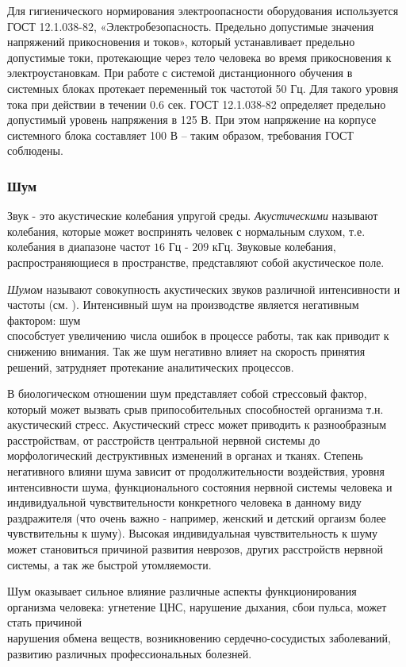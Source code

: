 Для гигиенического нормирования электроопасности оборудования используется ГОСТ 12.1.038-82, «Электробезопасность. Предельно допустимые значения напряжений  прикос\-новения и токов», который устанавливает предельно допустимые токи, протекающие через тело человека во время прикосновения к электроустановкам.
При работе с системой дистан\-ционного обучения в системных блоках протекает переменный ток частотой 50 Гц. Для такого уровня тока при действии в течении 0.6 сек. ГОСТ 12.1.038-82 определяет предельно допустимый уровень напряжения в 125 В. При этом напряжение на корпусе системного блока составляет 100 В – таким образом, требования ГОСТ соблюдены.

\subsubsection{Шум}

Звук - это акустические колебания упругой среды. {\itshape Акустическими} называют колебания, которые может воспринять человек с нормальным слухом, т.е. колебания в диапазоне частот $16$ Гц - $209$ кГц. Звуковые колебания, распространяющиеся в пространстве, предста\-вляют собой акустическое поле.

{\itshape Шумом} называют совокупность акустических звуков различной интенсивности и часто\-ты (см. \cite{10.}). Интенсивный шум на производстве является негативным фактором: шум\\ способстует увеличению числа ошибок в процессе работы, так как приводит к снижению внимания. Так же шум негативно влияет на скорость принятия решений, затрудняет протекание аналитических процессов.

В биологическом отношении шум представляет собой стрессовый фактор, который может вызвать срыв припособительных способностей организма т.н. акустический стресс. Акустический стресс может приводить к разнообразным расстройствам, от расстройств центральной нервной системы до морфологический деструктивных изменений в органах и тканях. Степень негативного влияни шума зависит от продолжительности воздействия, уровня интенсивности шума, функционального состояния нервной системы человека и индивидуальной чувствительности конкретного человека в данному виду раздражителя (что очень важно - например, женский и детский оргаизм более чувствительны к шуму). Высокая индивидуальная чувствительность к шуму может становиться причиной развития неврозов, других расстройств нервной системы, а так же быстрой утомляемости.

Шум оказывает сильное влияние различные аспекты функционирования организма человека: угнетение ЦНС, нарушение дыхания, сбои пульса, может стать причиной \\нарушения обмена веществ, возникновению сердечно-сосудистых заболеваний, развитию различных профессиональных болезней.

